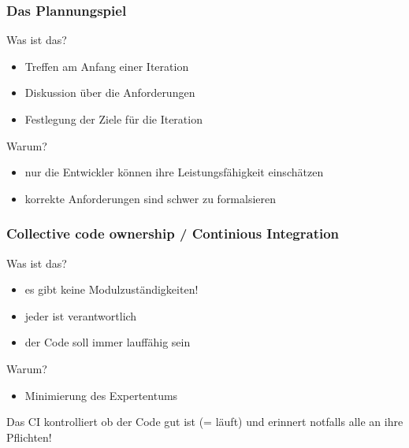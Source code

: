 \documentclass{beamer}
\begin{document}
\begin{frame}
    \frametitle{Das Plannungspiel}
    
    \begin{block}{Was ist das?}
        \begin{itemize}
            \item Treffen am Anfang einer Iteration
            \item Diskussion über die Anforderungen
            \item Festlegung der Ziele für die Iteration
        \end{itemize}
    \end{block}

    \begin{block}{Warum?}
        \begin{itemize}
            \item nur die Entwickler können ihre Leistungsfähigkeit einschätzen
            \item korrekte Anforderungen sind schwer zu formalsieren
        \end{itemize}
    \end{block}

\end{frame}


\begin{frame}
    \frametitle{Collective code ownership / Continious Integration}
    
    \begin{block}{Was ist das?}
        \begin{itemize}
            \item es gibt keine Modulzuständigkeiten!
            \item jeder ist verantwortlich
            \item der Code soll immer lauffähig sein
        \end{itemize}
    \end{block}

    \begin{block}{Warum?}
        \begin{itemize}
            \item Minimierung des Expertentums
        \end{itemize}
    \end{block}

    Das CI kontrolliert ob der Code gut ist (= läuft) und erinnert notfalls alle an ihre Pflichten!
\end{frame}
\end{document}
